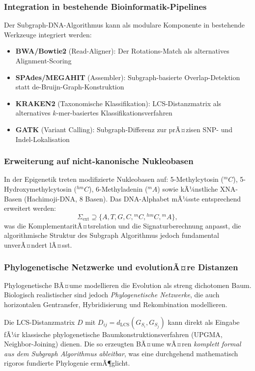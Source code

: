 ﻿\documentclass[a4paper,12pt]{article}
\theoremstyle{definition}
\begin{document}
\subsubsection{Integration in bestehende Bioinformatik-Pipelines}

Der Subgraph-DNA-Algorithmus kann als modulare Komponente in bestehende
Werkzeuge integriert werden:
\begin{itemize}
	\item \textbf{BWA/Bowtie2} (Read-Aligner): Der Rotations-Match als
	alternatives Alignment-Scoring
	\item \textbf{SPAdes/MEGAHIT} (Assembler): Subgraph-basierte
	Overlap-Detektion statt de-Bruijn-Graph-Konstruktion
	\item \textbf{KRAKEN2} (Taxonomische Klassifikation): LCS-Distanzmatrix
	als alternatives $k$-mer-basiertes Klassifikationsverfahren
	\item \textbf{GATK} (Variant Calling): Subgraph-Differenz zur
	prÃ¤zisen SNP- und Indel-Lokalisa\-tion
\end{itemize}

\subsubsection{Erweiterung auf nicht-kanonische Nukleobasen}

In der Epigenetik treten modifizierte Nukleobasen auf:
5-Methylcytosin (${}^m C$), 5-Hydroxy\-methylcytosin (${}^{hm}C$),
6-Methyladenin (${}^m A$) sowie kÃ¼nstliche XNA-Basen (Hachimoji-DNA, 8 Basen).
Das DNA-Alphabet mÃ¼sste entsprechend erweitert werden:
\[
\Sigma_{\text{ext}} \supseteq \{A, T, G, C, {}^mC, {}^{hm}C, {}^mA\},
\]
was die KomplementaritÃ¤tsrelation und die Signaturberechnung anpasst,
die algorithmische Struktur des Subgraph Algorithmus jedoch fundamental unverÃ¤ndert lÃ¤sst.

\subsubsection{Phylogenetische Netzwerke und evolutionÃ¤re Distanzen}

Phylogenetische BÃ¤ume modellieren die Evolution als streng dichotomen Baum.
Biologisch realistischer sind jedoch \textit{Phylogenetische Netzwerke},
die auch horizontalen Gentransfer, Hybridisierung und Rekombination modellieren.

Die LCS-Distanzmatrix $D$ mit $D_{ij} = d_{\mathrm{LCS}}(G_{S_i}, G_{S_j})$
kann direkt als Eingabe fÃ¼r klassische phylogenetische Baumkonstruktionsverfahren
(UPGMA, Neighbor-Joining) dienen. Die so erzeugten BÃ¤ume wÃ¤ren
\textit{komplett formal aus dem Subgraph Algorithmus ableitbar}, was eine
durchgehend mathematisch rigoros fundierte Phylogenie ermÃ¶glicht.
\end{document}
